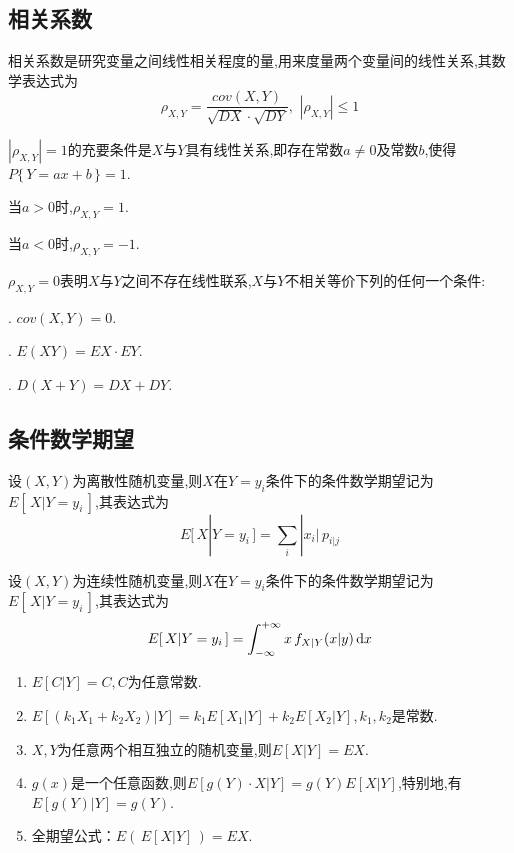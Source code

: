 \subsection{相关系数}
\tdefination[相关系数]
相关系数是研究变量之间线性相关程度的量,用来度量两个变量间的线性关系,其数学表达式为
\begin{equation}
\rho_{X,Y}=\frac{cov(X,Y)}{\sqrt{DX}\cdot \sqrt{DY}},\,\,|\rho_{X,Y}|\le 1
\end{equation}\jg
\par $|\rho_{X,Y}|= 1$的充要条件是$X$与$Y$具有线性关系,即存在常数$a\ne 0$及常数$b$,使得$P\lbrace \, Y = ax+b \, \rbrace=1$.
\par \quad \quad 当$a>0$时,$\rho_{X,Y}= 1$.
\par \quad \quad 当$a<0$时,$\rho_{X,Y}= -1$.\jg\jg
\par $\rho_{X,Y}= 0$表明$X$与$Y$之间不存在线性联系,$X$与$Y$不相关等价下列的任何一个条件:
\par \quad {}.  $cov(X,Y)=0.$
\par \quad {}.  $E(XY)=EX\cdot EY$.
\par \quad {}.  $D(X+Y)=DX+DY.$\jg\jg

\subsection{条件数学期望}
\par 设$(X,Y)$为离散性随机变量,则$X$在$Y=y_i$条件下的条件数学期望记为$E[\, X|Y=y_i \,]$,其表达式为
\begin{equation}
E[\, X|Y=y_i \,]=\sum\limits_{i}|x_i|\,p_{i|j}
\end{equation}\jg

\noindent {}
\par 设$(X,Y)$为连续性随机变量,则$X$在$Y=y_i$条件下的条件数学期望记为$E[\, X|Y=y_i \,]$,其表达式为
\begin{equation}
E[\, X|Y=y_i \,]=\int_{- \infty }^{+\infty }x\,f_{X|Y}(x|y)\,{\rm{d}} x
\end{equation}

\noindent \dya[条件数学期望的性质]\jg
\begin{enumerate}[1.]
	\setlength{\itemindent}{2em}
	\setlength{\topsep}{0.01em}
	\setlength{\itemsep}{0.01em}
	\item $E[C|Y]=C,C$为任意常数.
	\item $E[(k_1X_1+k_2X_2)|Y]=k_1E[X_1|Y]+k_2E[X_2|Y],k_1,k_2$是常数.
	\item $X,Y$为任意两个相互独立的随机变量,则$E[X|Y]=EX$.
	\item $g(x)$是一个任意函数,则$E[g(Y)\cdot X|Y]=g(Y)E[X|Y]$,特别地,有$E[g(Y)|Y]=g(Y)$.
	\item 全期望公式：$E(\,E[X|Y]\,)=EX$.
\end{enumerate}

